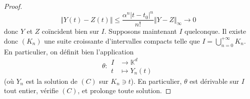 \begin{proof}
		\[ \Vert Y(t) - Z(t) \Vert \leq \frac{\alpha^n |t-t_0|^n}{n!} \Vert Y-Z \Vert_{\infty} \longrightarrow 0 \]
		donc $Y$ et $Z$ coïncident bien sur $I$.
		\newpar
		Supposons maintenant $I$ quelconque. Il existe donc $(K_n)$ une suite croissante d'intervalles compacts telle que $I = \bigcup_{n = 0}^{+\infty} K_n$. En particulier, on définit bien l'application
		\[
		\theta :
		\begin{array}{cl}
			I &\rightarrow \mathbb{K}^d \\
			t &\mapsto Y_n(t)
		\end{array}
		\]
		(où $Y_n$ est la solution de $(C)$ sur $K_n \ni t$). En particulier, $\theta$ est dérivable sur $I$ tout entier, vérifie $(C)$, et prolonge toute solution.
	\end{proof}

